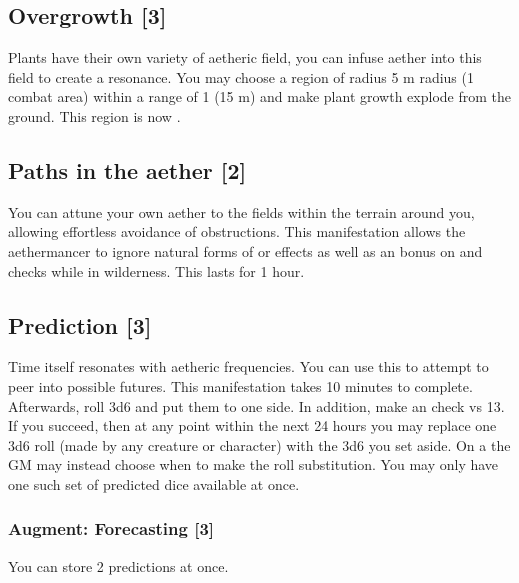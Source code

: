 \subsection{Overgrowth [3]}
\label{spell:overgrowth}
Plants have their own variety of aetheric field, you can infuse aether into this field to create a resonance. You may choose a region of radius 5 m radius (1 combat area) within a range of 1 (15 m) and make plant growth explode from the ground. This region is now .


\subsection{Paths in the aether [2]}
You can attune your own aether to the fields within the terrain around you, allowing effortless avoidance of obstructions. This manifestation allows the aethermancer to ignore natural forms of  or  effects as well as an  bonus on  and  checks while in wilderness. This lasts for 1 hour.


\subsection{Prediction [3]}
Time itself resonates with aetheric frequencies. You can use this to attempt to peer into possible futures. This manifestation takes 10 minutes to complete. Afterwards, roll 3d6 and put them to one side. In addition, make an  check vs  13. If you succeed, then at any point within the next 24 hours you may replace one 3d6 roll (made by any creature or character) with the 3d6 you set aside. On a  the GM may instead choose when to make the roll substitution. You may only have one such set of predicted dice available at once.
\subsubsection{Augment: Forecasting [3]}
You can store 2 predictions at once.




